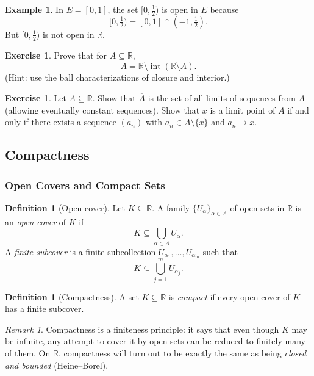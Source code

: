 \documentclass[12pt]{article}
\numberwithin{equation}{section}
\newcommand{\RR}{\mathbb{R}}
\DeclareMathOperator{\Int}{int}
\theoremstyle{plain}
\theoremstyle{definition}
\newtheorem{definition}[theorem]{Definition}
\newtheorem{example}[theorem]{Example}
\newtheorem{exercise}[theorem]{Exercise}
\theoremstyle{remark}
\newtheorem{remark}[theorem]{Remark}
\begin{document}
\begin{example}
In $E=[0,1]$, the set $[0,\tfrac12)$ is open in $E$ because
\[
[0,\tfrac12) = [0,1]\cap (-1,\tfrac12).
\]
But $[0,\tfrac12)$ is not open in $\RR$.
\end{example}

\begin{exercise}
Prove that for $A\subseteq\RR$,
\[
\overline{A} = \RR \setminus \Int(\RR\setminus A).
\]
(Hint: use the ball characterizations of closure and interior.)
\end{exercise}

\begin{exercise}
Let $A\subseteq\RR$. Show that $\overline{A}$ is the set of all limits of sequences from $A$ (allowing eventually constant sequences).
Show that $x$ is a limit point of $A$ if and only if there exists a sequence $(a_n)$ with $a_n\in A\setminus\{x\}$ and $a_n\to x$.
\end{exercise}

\newpage

\subsection{Compactness}

\subsubsection{Open Covers and Compact Sets}

\begin{definition}[Open cover]
Let $K\subseteq\RR$. A family $\{U_\alpha\}_{\alpha\in A}$ of open sets in $\RR$ is an \emph{open cover} of $K$ if
\[
K \subseteq \bigcup_{\alpha\in A} U_\alpha.
\]
A \emph{finite subcover} is a finite subcollection $U_{\alpha_1},\dots,U_{\alpha_m}$ such that
\[
K \subseteq \bigcup_{j=1}^{m} U_{\alpha_j}.
\]
\end{definition}

\begin{definition}[Compactness]\label{def:compact}
A set $K\subseteq\RR$ is \emph{compact} if every open cover of $K$ has a finite subcover.
\end{definition}

\begin{remark}
Compactness is a finiteness principle: it says that even though $K$ may be infinite, any attempt to cover it by open sets can be reduced to finitely many of them.
On $\RR$, compactness will turn out to be exactly the same as being \emph{closed and bounded} (Heine--Borel).
\end{remark}
\end{document}
